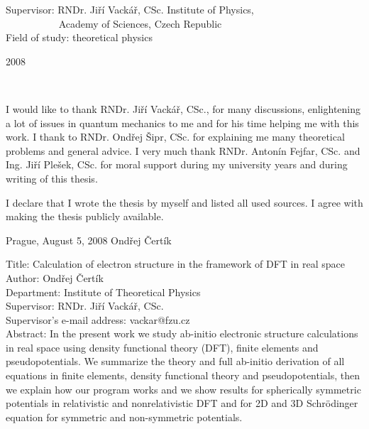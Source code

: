 \documentclass[12pt,notitlepage]{report}
\begin{document}
\begin{titlepage}
\large
\noindent Supervisor: RNDr. Jiří Vackář, CSc. Institute of Physics, \\
\hbox{$\quad\quad\quad\quad\quad$}   Academy of Sciences, Czech Republic
\vspace{1mm}\\
%
\noindent Field of study: theoretical physics
\bigskip
\bigskip
\begin{center}
2008
\end{center}

\end{titlepage}

\normalsize
\setcounter{page}{2}
\ \vspace{10mm}

\noindent I would like to thank RNDr. Jiří Vackář, CSc., for many discussions,
enlightening a lot of issues in quantum mechanics to me and for his time
helping me with this work. I thank to RNDr. Ondřej Šipr, CSc. for explaining me
many theoretical problems and general advice. I very much thank RNDr.  Antonín
Fejfar, CSc. and Ing. Jiří Plešek, CSc. for moral support during my university
years and during writing of this thesis.

\vspace{\fill}
\noindent I declare that I wrote the thesis by myself and listed all used
sources. I agree with making the thesis publicly available.

\bigskip
\noindent Prague, August 5, 2008 \hspace{\fill}Ondřej Čertík\\ %



\newpage %

\noindent
Title: Calculation of electron structure in the framework of DFT in real
space\\
Author: Ondřej Čertík\\
Department: Institute of Theoretical Physics\\
Supervisor: RNDr. Jiří Vackář, CSc.\\
Supervisor's e-mail address: vackar@fzu.cz\\

\noindent Abstract: In the present work we study ab-initio electronic structure
calculations in real space using density functional theory (DFT), finite
elements and pseudopotentials. We summarize the theory and full ab-initio
derivation of all equations in finite elements, density functional theory and
pseudopotentials, then we explain how our program works and we show results for
spherically symmetric potentials in relativistic and nonrelativistic DFT and
for 2D and 3D Schr\"odinger equation for symmetric and non-symmetric
potentials. \\
\end{document}

